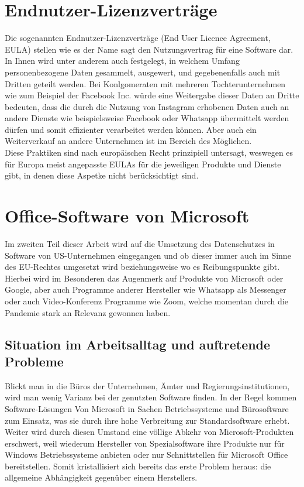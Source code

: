 \section{Endnutzer-Lizenzverträge}
Die sogenannten Endnutzer-Lizenzverträge (\glqq End User Licence Agreement\grqq{}, EULA) stellen wie es der Name sagt den Nutzungsvertrag für eine Software dar. In Ihnen wird unter anderem auch festgelegt, in welchem Umfang personenbezogene Daten gesammelt, ausgewert, und gegebenenfalls auch mit Dritten geteilt werden. Bei Konlgomeraten mit mehreren Tochterunternehmen wie zum Beispiel der Facebook Inc. würde eine Weitergabe dieser Daten an Dritte bedeuten, dass die durch die Nutzung von Instagram erhobenen Daten auch an andere Dienste wie beispielsweise Facebook oder Whatsapp übermittelt werden dürfen und somit effizienter verarbeitet werden können. Aber auch ein Weiterverkauf an andere Unternehmen ist im Bereich des Möglichen.\\
Diese Praktiken sind nach europäischen Recht prinzipiell untersagt, weswegen es für Europa meist angepasste EULAs für die jeweiligen Produkte und Dienste gibt, in denen diese Aspetke nicht berücksichtigt sind.

\section{Office-Software von Microsoft}
Im zweiten Teil dieser Arbeit wird auf die Umsetzung des Datenschutzes in Software von US-Unternehmen eingegangen und ob dieser immer auch im Sinne des EU-Rechtes umgesetzt wird beziehungsweise wo es Reibungspunkte gibt. Hierbei wird im Besonderen das Augenmerk auf Produkte von Microsoft oder Google, aber auch Programme anderer Hersteller wie Whatsapp als Messenger oder auch Video-Konferenz Programme wie Zoom, welche momentan durch die Pandemie stark an Relevanz gewonnen haben.

\subsection{Situation im Arbeitsalltag und auftretende Probleme}
Blickt man in die Büros der Unternehmen, Ämter und Regierungsinstitutionen, wird man wenig Varianz bei der genutzten Software finden. In der Regel kommen Software-Lösungen Von Microsoft in Sachen Betriebssysteme und Bürosoftware zum Einsatz, was sie durch ihre hohe Verbreitung zur Standardsoftware erhebt. Weiter wird durch diesen Umstand eine völlige Abkehr von Microsoft-Produkten erschwert, weil wiederum Hersteller von Spezialsoftware ihre Produkte nur für Windows Betriebssysteme anbieten oder nur Schnittstellen für Microsoft Office bereitstellen. Somit kristallisiert sich bereits das erste Problem heraus: die allgemeine Abhängigkeit gegenüber einem Herstellers.


